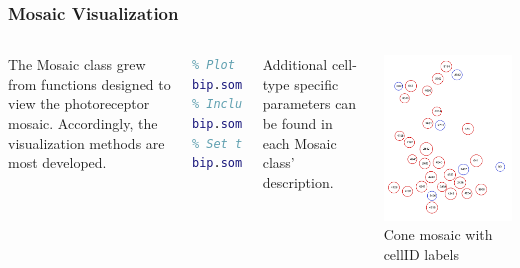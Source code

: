 \documentclass[11pt]{beamer}
\begin{document}
\begin{frame}[fragile]
	\frametitle{Mosaic Visualization}
	\begin{columns}
			The Mosaic class grew from functions designed to view the photoreceptor mosaic. Accordingly, the visualization methods are most developed.
\begin{lstlisting}[language=matlab]
% Basic plot of cell 'somas'
% Plot to existing axis
bip.somaPlot('ax', axesHandle);
% Include cell ID labels
bip.somaPlot('lbl', true);
% Set the color and linewidth
bip.somaPlot('co', [1 0 0], 'lw', 1);\end{lstlisting}
\vskip15pt
Additional cell-type specific parameters can be found in each Mosaic class' description.
			\begin{center}
				\includegraphics[width=\textwidth]{prMosaic}
				\vskip10pt
				{\footnotesize Cone mosaic with cellID labels}	
			\end{center}		
	\end{columns}
\end{frame}
\end{document}
